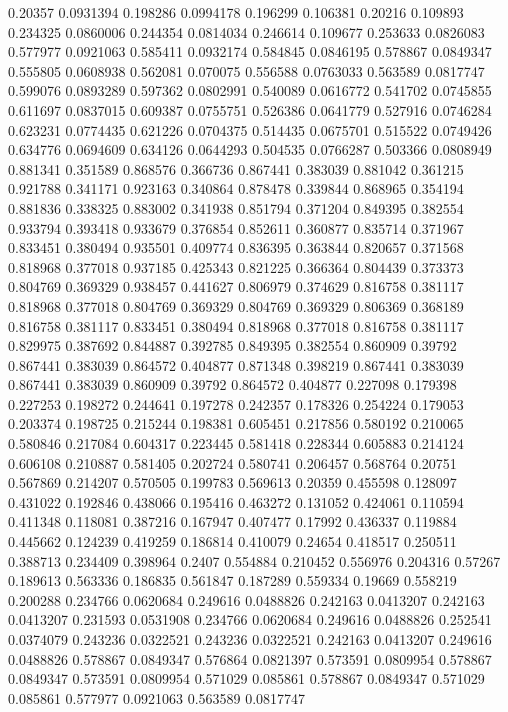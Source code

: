 0.20357 0.0931394
0.198286 0.0994178
0.196299 0.106381
0.20216 0.109893
0.234325 0.0860006
0.244354 0.0814034
0.246614 0.109677
0.253633 0.0826083
0.577977 0.0921063
0.585411 0.0932174
0.584845 0.0846195
0.578867 0.0849347
0.555805 0.0608938
0.562081 0.070075
0.556588 0.0763033
0.563589 0.0817747
0.599076 0.0893289
0.597362 0.0802991
0.540089 0.0616772
0.541702 0.0745855
0.611697 0.0837015
0.609387 0.0755751
0.526386 0.0641779
0.527916 0.0746284
0.623231 0.0774435
0.621226 0.0704375
0.514435 0.0675701
0.515522 0.0749426
0.634776 0.0694609
0.634126 0.0644293
0.504535 0.0766287
0.503366 0.0808949
0.881341 0.351589
0.868576 0.366736
0.867441 0.383039
0.881042 0.361215
0.921788 0.341171
0.923163 0.340864
0.878478 0.339844
0.868965 0.354194
0.881836 0.338325
0.883002 0.341938
0.851794 0.371204
0.849395 0.382554
0.933794 0.393418
0.933679 0.376854
0.852611 0.360877
0.835714 0.371967
0.833451 0.380494
0.935501 0.409774
0.836395 0.363844
0.820657 0.371568
0.818968 0.377018
0.937185 0.425343
0.821225 0.366364
0.804439 0.373373
0.804769 0.369329
0.938457 0.441627
0.806979 0.374629
0.816758 0.381117
0.818968 0.377018
0.804769 0.369329
0.804769 0.369329
0.806369 0.368189
0.816758 0.381117
0.833451 0.380494
0.818968 0.377018
0.816758 0.381117
0.829975 0.387692
0.844887 0.392785
0.849395 0.382554
0.860909 0.39792
0.867441 0.383039
0.864572 0.404877
0.871348 0.398219
0.867441 0.383039
0.867441 0.383039
0.860909 0.39792
0.864572 0.404877
0.227098 0.179398
0.227253 0.198272
0.244641 0.197278
0.242357 0.178326
0.254224 0.179053
0.203374 0.198725
0.215244 0.198381
0.605451 0.217856
0.580192 0.210065
0.580846 0.217084
0.604317 0.223445
0.581418 0.228344
0.605883 0.214124
0.606108 0.210887
0.581405 0.202724
0.580741 0.206457
0.568764 0.20751
0.567869 0.214207
0.570505 0.199783
0.569613 0.20359
0.455598 0.128097
0.431022 0.192846
0.438066 0.195416
0.463272 0.131052
0.424061 0.110594
0.411348 0.118081
0.387216 0.167947
0.407477 0.17992
0.436337 0.119884
0.445662 0.124239
0.419259 0.186814
0.410079 0.24654
0.418517 0.250511
0.388713 0.234409
0.398964 0.2407
0.554884 0.210452
0.556976 0.204316
0.57267 0.189613
0.563336 0.186835
0.561847 0.187289
0.559334 0.19669
0.558219 0.200288
0.234766 0.0620684
0.249616 0.0488826
0.242163 0.0413207
0.242163 0.0413207
0.231593 0.0531908
0.234766 0.0620684
0.249616 0.0488826
0.252541 0.0374079
0.243236 0.0322521
0.243236 0.0322521
0.242163 0.0413207
0.249616 0.0488826
0.578867 0.0849347
0.576864 0.0821397
0.573591 0.0809954
0.578867 0.0849347
0.573591 0.0809954
0.571029 0.085861
0.578867 0.0849347
0.571029 0.085861
0.577977 0.0921063
0.563589 0.0817747
